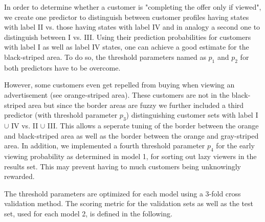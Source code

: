\documentclass[11pt]{article} %
\begin{document}
In order to determine whether a customer is "completing the offer only if viewed", we create one predictor to distinguish between customer profiles having states with label II vs. those having states with label IV and in analogy a second one to distinguish between I vs. III.
Using their prediction probabilities for customers with label I as well as label IV states, one can achieve a good estimate for the black-striped area. To do so, the threshold parameters named as $p_1$ and $ p_2$ for both predictors have to be overcome.

However, some customers even get repelled from buying when viewing an advertisement (see orange-striped area). These customers are not in the black-striped area but since the border areas are fuzzy we
further included a third predictor (with threshold parameter $p_3$) distinguishing customer sets with label I $\cup$ IV vs. II $\cup$ III. This allows a seperate tuning of the border between the orange and black-striped area as well as the border between the orange and gray-striped area. In addition, we implemented a fourth threshold parameter $p_4$ for the early viewing probability as determined in model 1, for sorting out lazy viewers in the results set.
This may prevent having to much customers being unknowingly rewarded.

The threshold parameters are optimized for each model using a 3-fold cross validation method.
The scoring metric for the validation sets  as well as the test set, used for each model 2, is defined in the following.
\end{document}
